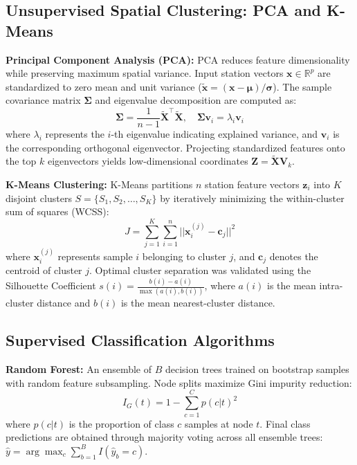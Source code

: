 \documentclass[conference]{IEEEtran}
\begin{document}
\subsection{Unsupervised Spatial Clustering: PCA and K-Means}
\textbf{Principal Component Analysis (PCA):} PCA reduces feature dimensionality while preserving maximum spatial variance. Input station vectors $\mathbf{x} \in \mathbb{R}^p$ are standardized to zero mean and unit variance ($\tilde{\mathbf{x}} = (\mathbf{x} - \boldsymbol{\mu}) / \boldsymbol{\sigma}$). The sample covariance matrix $\mathbf{\Sigma}$ and eigenvalue decomposition are computed as:
\begin{equation}
\mathbf{\Sigma} = \frac{1}{n-1} \tilde{\mathbf{X}}^\top \tilde{\mathbf{X}}, \quad \mathbf{\Sigma}\mathbf{v}_i = \lambda_i \mathbf{v}_i
\label{eq:pca_cov}
\end{equation}
where $\lambda_i$ represents the $i$-th eigenvalue indicating explained variance, and $\mathbf{v}_i$ is the corresponding orthogonal eigenvector. Projecting standardized features onto the top $k$ eigenvectors yields low-dimensional coordinates $\mathbf{Z} = \tilde{\mathbf{X}}\mathbf{V}_k$.

\textbf{K-Means Clustering:} K-Means partitions $n$ station feature vectors $\mathbf{z}_i$ into $K$ disjoint clusters $S = \{S_1, S_2, \dots, S_K\}$ by iteratively minimizing the within-cluster sum of squares (WCSS):
\begin{equation}
J = \sum_{j=1}^{K} \sum_{i=1}^{n} || \mathbf{x}_i^{(j)} - \mathbf{c}_j ||^2
\label{eq:kmeans}
\end{equation}
where $\mathbf{x}_i^{(j)}$ represents sample $i$ belonging to cluster $j$, and $\mathbf{c}_j$ denotes the centroid of cluster $j$. Optimal cluster separation was validated using the Silhouette Coefficient $s(i) = \frac{b(i) - a(i)}{\max(a(i), b(i))}$, where $a(i)$ is the mean intra-cluster distance and $b(i)$ is the mean nearest-cluster distance.

\subsection{Supervised Classification Algorithms}
\textbf{Random Forest:} An ensemble of $B$ decision trees trained on bootstrap samples with random feature subsampling. Node splits maximize Gini impurity reduction:
\begin{equation}
I_G(t) = 1 - \sum_{c=1}^{C} p(c|t)^2
\label{eq:gini}
\end{equation}
where $p(c|t)$ is the proportion of class $c$ samples at node $t$. Final class predictions are obtained through majority voting across all ensemble trees: $\hat{y} = \arg\max_c \sum_{b=1}^{B} I(\hat{y}_b = c)$.
\end{document}
